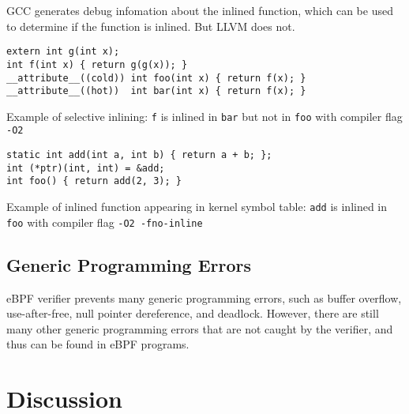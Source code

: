GCC generates debug infomation about the inlined function, which can be used to determine if the function is inlined. But LLVM does not. 


\begin{listing}[t]
\begin{verbatim}
extern int g(int x);
int f(int x) { return g(g(x)); }
__attribute__((cold)) int foo(int x) { return f(x); }
__attribute__((hot))  int bar(int x) { return f(x); }
\end{verbatim}
\caption{Example of selective inlining: \texttt{f} is inlined in \texttt{bar} but not in \texttt{foo} with compiler flag \texttt{-O2}}
\label{fig:compiler_selective_inlining}
\end{listing}

\begin{listing}[t]
\begin{verbatim}
static int add(int a, int b) { return a + b; };
int (*ptr)(int, int) = &add;
int foo() { return add(2, 3); }
\end{verbatim}
\caption{Example of inlined function appearing in kernel symbol table: \texttt{add} is inlined in \texttt{foo} with compiler flag \texttt{-O2 -fno-inline}}
\label{fig:compiler_inlined_in_symbol_table}
\end{listing}

\subsection{Generic Programming Errors}
eBPF verifier prevents many generic programming errors, such as buffer overflow, use-after-free, null pointer dereference, and deadlock.
However, there are still many other generic programming errors that are not caught by the verifier, and thus can be found in eBPF programs.


\section{Discussion}
